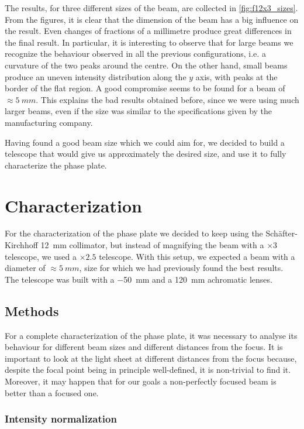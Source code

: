 The results, for three different sizes of the beam, are collected in \cref{fig:f12x3_sizes}. From the figures, it is clear that the dimension of the beam has a big influence on the result. Even changes of fractions of a millimetre produce great differences in the final result. In particular, it is interesting to observe that for large beams we recognize the behaviour observed in all the previous configurations, i.e. a curvature of the two peaks around the centre. On the other hand, small beams produce an uneven intensity distribution along the $y$ axis, with peaks at the border of the flat region. A good compromise seems to be found for a beam of $\approx \SI{5}{mm}$. This explains the bad results obtained before, since we were using much larger beams, even if the size was similar to the specifications given by the manufacturing company.

Having found a good beam size which we could aim for, we decided to build a telescope that would give us approximately the desired size, and use it to fully characterize the phase plate.

\section{Characterization}
\label{sec:characterization}
For the characterization of the phase plate we decided to keep using the Schäfter-Kirchhoff \SI{12}{mm} collimator, but instead of magnifying the beam with a $\times3$ telescope, we used a $\times2.5$ telescope. With this setup, we expected a beam with a diameter of $\approx \SI{5}{mm}$, size for which we had previously found the best results. The telescope was built with a \SI{-50}{mm} and a \SI{120}{mm} achromatic lenses.

\subsection{Methods}
\label{sec:characterization_methods}
For a complete characterization of the phase plate, it was necessary to analyse its behaviour for different beam sizes and different distances from the focus. It is important to look at the light sheet at different distances from the focus because, despite the focal point being in principle well-defined, it is non-trivial to find it. Moreover, it may happen that for our goals a non-perfectly focused beam is better than a focused one.

\subsubsection{Intensity normalization}

